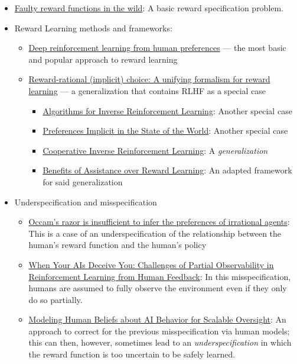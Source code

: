 \documentclass[11pt]{article}
\begin{document}
\begin{itemize}
  \item \href{https://openai.com/index/faulty-reward-functions/?video=745142691}{Faulty reward functions in the wild}: A basic reward specification problem.
  \item Reward Learning methods and frameworks:
  \begin{itemize}
    \item \href{https://arxiv.org/abs/1706.03741}{Deep reinforcement learning from human preferences} — the most basic and popular approach to reward learning
    \item \href{https://arxiv.org/abs/2002.04833}{Reward-rational (implicit) choice: A unifying formalism for reward learning} — a generalization that contains RLHF as a special case
    \begin{itemize}
      \item \href{https://ai.stanford.edu/~ang/papers/icml00-irl.pdf}{Algorithms for Inverse Reinforcement Learning}: Another special case
      \item \href{https://arxiv.org/abs/1902.04198}{Preferences Implicit in the State of the World}: Another special case
      \item \href{https://arxiv.org/abs/1606.03137}{Cooperative Inverse Reinforcement Learning}: A \emph{generalization}
      \item \href{https://people.eecs.berkeley.edu/~russell/papers/neurips20ws-assistance}{Benefits of Assistance over Reward Learning}: An adapted framework for said generalization
    \end{itemize}
  \end{itemize}
  \item Underspecification and misspecification
  \begin{itemize}
    \item \href{https://proceedings.neurips.cc/paper/2018/hash/d89a66c7c80a29b1bdbab0f2a1a94af8-Abstract.html}{Occam’s razor is insufficient to infer the preferences of irrational agents}: This is a case of an underspecification of the relationship between the human’s reward function and the human’s policy
    \item \href{https://arxiv.org/abs/2402.17747}{When Your AIs Deceive You: Challenges of Partial Observability in Reinforcement Learning from Human Feedback}: In this misspecification, humans are assumed to fully observe the environment even if they only do so partially.
    \item \href{https://arxiv.org/abs/2502.21262}{Modeling Human Beliefs about AI Behavior for Scalable Oversight}: An approach to correct for the previous misspecification via human models; this can then, however, sometimes lead to an \emph{underspecification} in which the reward function is too uncertain to be safely learned.

\end{itemize}
\end{itemize}
\end{document}
